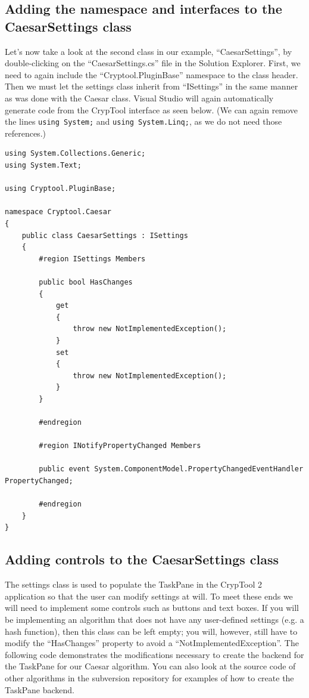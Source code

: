 \subsection{Adding the namespace and interfaces to the CaesarSettings class}
\label{sec:AddingTheNamespaceAndInterfacesToTheCaesarSettingsClass}

Let's now take a look at the second class in our example, ``CaesarSettings'', by double-clicking on the ``CaesarSettings.cs'' file in the Solution Explorer. First, we need to again include the ``Cryptool.PluginBase'' namespace to the class header. Then we must let the settings class inherit from ``ISettings'' in the same manner as was done with the Caesar class. Visual Studio will again automatically generate code from the CrypTool interface as seen below. (We can again remove the lines \texttt{using System;} and \texttt{using System.Linq;}, as we do not need those references.)\\

\begin{lstlisting}
using System.Collections.Generic;
using System.Text;

using Cryptool.PluginBase;

namespace Cryptool.Caesar
{
    public class CaesarSettings : ISettings
    {
        #region ISettings Members

        public bool HasChanges
        {
            get
            {
                throw new NotImplementedException();
            }
            set
            {
                throw new NotImplementedException();
            }
        }

        #endregion

        #region INotifyPropertyChanged Members

        public event System.ComponentModel.PropertyChangedEventHandler PropertyChanged;

        #endregion
    }
}
\end{lstlisting}

\subsection{Adding controls to the CaesarSettings class}
\label{sec:AddingControlsToTheCaesarSettingsClass}

The settings class is used to populate the TaskPane in the CrypTool 2 application so that the user can modify settings at will. To meet these ends we will need to implement some controls such as buttons and text boxes. If you will be implementing an algorithm that does not have any user-defined settings (e.g. a hash function), then this class can be left empty; you will, however, still have to modify the ``HasChanges'' property to avoid a ``NotImplementedException''. The following code demonstrates the modifications necessary to create the backend for the TaskPane for our Caesar algorithm. You can also look at the source code of other algorithms in the subversion repository for examples of how to create the TaskPane backend.\\

